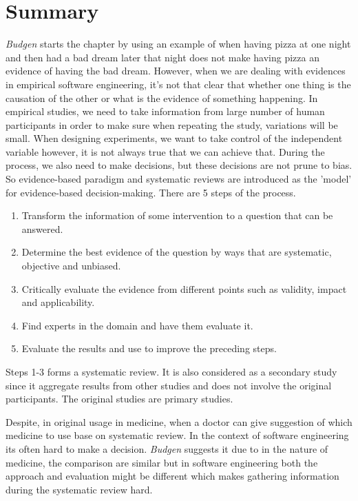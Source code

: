 \documentclass[sigconf]{acmart}
\begin{document}
%
\maketitle

\section{Summary}

{\it Budgen} starts the chapter by using an example of when having pizza at one night and then had a bad dream later that night does not make having pizza an evidence of having the bad dream. However, when we are dealing with evidences in empirical software engineering, it's not that clear that whether one thing is the causation of the other or what is the evidence of something happening. In empirical studies, we need to take information from large number of human participants in order to make sure when repeating the study, variations will be small. When designing experiments, we want to take control of the independent variable however, it is not always true that we can achieve that. During the process, we also need to make decisions, but these decisions are not prune to bias. So evidence-based paradigm and systematic reviews are introduced as the 'model' for evidence-based decision-making. There are 5 steps of the process.

\begin{enumerate}
    \item Transform the information of some intervention to a question that can be answered.
    \item Determine the best evidence of the question by ways that are systematic, objective and unbiased.
    \item Critically evaluate the evidence from different points such as validity, impact and applicability.
    \item Find experts in the domain and have them evaluate it.
    \item Evaluate the results and use to improve the preceding steps.
\end{enumerate}

Steps 1-3 forms a systematic review. It is also considered as a secondary study since it aggregate results from other studies and does not involve the original participants. The original studies are primary studies. 

Despite, in original usage in medicine, when a doctor can give suggestion of which medicine to use base on systematic review. In the context of software engineering its often hard to make a decision. {\it Budgen} suggests it due to in the nature of medicine, the comparison are similar but in software engineering both the approach and evaluation might be different which makes gathering information during the systematic review hard. 
\end{document}
